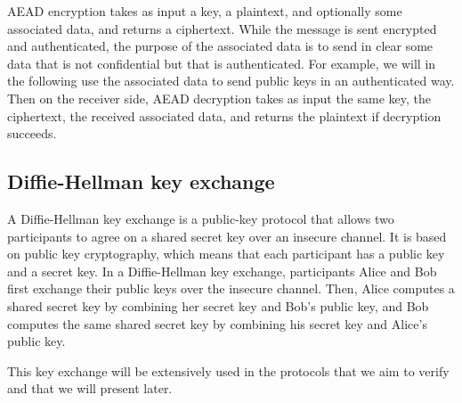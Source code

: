 AEAD encryption takes as input a key, a plaintext, and optionally some associated data, and returns a ciphertext.
While the message is sent encrypted and authenticated, the purpose of the associated data is to send in clear some data that is not confidential but that is authenticated.
For example, we will in the following use the associated data to send public keys in an authenticated way.
Then on the receiver side, AEAD decryption takes as input the same key, the ciphertext, the received associated data, and returns the plaintext if decryption succeeds.

\subsection{Diffie-Hellman key exchange}

A Diffie-Hellman key exchange is a public-key protocol that allows two participants to agree on a shared secret key over an insecure channel.
It is based on public key cryptography, which means that each participant has a public key and a secret key.
In a Diffie-Hellman key exchange, participants Alice and Bob first exchange their public keys over the insecure channel.
Then, Alice computes a shared secret key by combining her secret key and Bob's public key, and Bob computes the same shared secret key by combining his secret key and Alice's public key.

This key exchange will be extensively used in the protocols that we aim to verify and that we will present later.